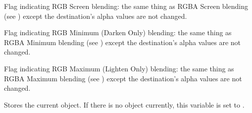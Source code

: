 \documentclass[letterpaper,10pt,english]{sphinxmanual}
\begin{document}

\begin{fulllineitems}
\label{sge:sge.sge.BLEND_RGB_SCREEN}
Flag indicating RGB Screen blending: the same thing as RGBA Screen
blending (see {\hyperref[sge:sge.sge.BLEND_RGBA_SCREEN]{\emph{}}}) except the destination's
alpha values are not changed.

\end{fulllineitems}


\begin{fulllineitems}
\label{sge:sge.sge.BLEND_RGB_MINIMUM}
Flag indicating RGB Minimum (Darken Only) blending: the same thing
as RGBA Minimum blending (see {\hyperref[sge:sge.sge.BLEND_RGBA_MINIMUM]{\emph{}}}) except
the destination's alpha values are not changed.

\end{fulllineitems}


\begin{fulllineitems}
\label{sge:sge.sge.BLEND_RGB_MAXIMUM}
Flag indicating RGB Maximum (Lighten Only) blending: the same thing
as RGBA Maximum blending (see {\hyperref[sge:sge.sge.BLEND_RGBA_MAXIMUM]{\emph{}}}) except
the destination's alpha values are not changed.

\end{fulllineitems}


\begin{fulllineitems}
\label{sge:sge.sge.game}
Stores the current {\hyperref[dsp:sge.dsp.Game]{\emph{}}} object.  If there is no
{\hyperref[dsp:sge.dsp.Game]{\emph{}}} object currently, this variable is set to
.

\end{fulllineitems}
\end{document}
